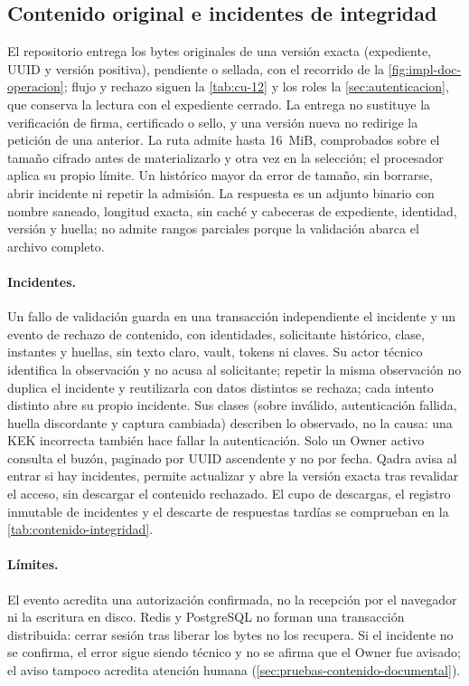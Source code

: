 \subsection{Contenido original e incidentes de integridad}\label{sec:impl-contenido-documental}

El repositorio entrega los bytes originales de una versión exacta (expediente, UUID y versión positiva), pendiente o sellada, con el recorrido de la \cref{fig:impl-doc-operacion}; flujo y rechazo siguen la \cref{tab:cu-12} y los roles la \cref{sec:autenticacion}, que conserva la lectura con el expediente cerrado. La entrega no sustituye la verificación de firma, certificado o sello, y una versión nueva no redirige la petición de una anterior. La ruta admite hasta 16~MiB, comprobados sobre el tamaño cifrado antes de materializarlo y otra vez en la selección; el procesador aplica su propio límite. Un histórico mayor da error de tamaño, sin borrarse, abrir incidente ni repetir la admisión. La respuesta es un adjunto binario con nombre saneado, longitud exacta, sin caché y cabeceras de expediente, identidad, versión y huella; no admite rangos parciales porque la validación abarca el archivo completo.

\paragraph{Incidentes.} Un fallo de validación guarda en una transacción independiente el incidente y un evento de rechazo de contenido, con identidades, solicitante histórico, clase, instantes y huellas, sin texto claro, vault, tokens ni claves. Su actor técnico identifica la observación y no acusa al solicitante; repetir la misma observación no duplica el incidente y reutilizarla con datos distintos se rechaza; cada intento distinto abre su propio incidente. Sus clases (sobre inválido, autenticación fallida, huella discordante y captura cambiada) describen lo observado, no la causa: una KEK incorrecta también hace fallar la autenticación. Solo un Owner activo consulta el buzón, paginado por UUID ascendente y no por fecha. Qadra avisa al entrar si hay incidentes, permite actualizar y abre la versión exacta tras revalidar el acceso, sin descargar el contenido rechazado. El cupo de descargas, el registro inmutable de incidentes y el descarte de respuestas tardías se comprueban en la \cref{tab:contenido-integridad}.

\paragraph{Límites.} El evento acredita una autorización confirmada, no la recepción por el navegador ni la escritura en disco. Redis y PostgreSQL no forman una transacción distribuida: cerrar sesión tras liberar los bytes no los recupera. Si el incidente no se confirma, el error sigue siendo técnico y no se afirma que el Owner fue avisado; el aviso tampoco acredita atención humana (\cref{sec:pruebas-contenido-documental}).

